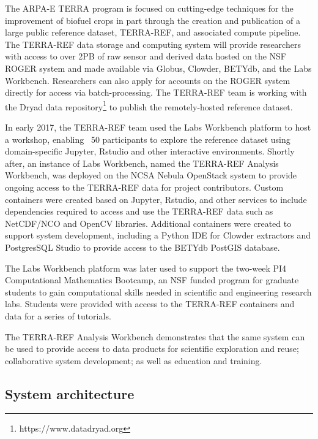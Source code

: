 \documentclass{sig-alternate}
\begin{document}
The ARPA-E TERRA program is focused on cutting-edge techniques for the improvement of biofuel crops in part through the creation and publication of a large public reference dataset, TERRA-REF, and associated compute pipeline\cite{arpae2015}. The TERRA-REF data storage and computing system will provide researchers with access to over 2PB of raw sensor and derived data hosted on the NSF ROGER system and made available via Globus, Clowder, BETYdb, and the Labs Workbench. Researchers can also apply for accounts on the ROGER system directly for access via batch-processing. The TERRA-REF team is working with the Dryad data repository\footnote{https://www.datadryad.org} to publish the remotely-hosted reference dataset.

In early 2017, the TERRA-REF team used the Labs Workbench platform to host a workshop, enabling ~50 participants to explore the reference dataset using domain-specific Jupyter, Rstudio and other interactive environments. Shortly after, an instance of Labs Workbench, named the TERRA-REF Analysis Workbench, was deployed on the NCSA Nebula OpenStack system to provide ongoing access to the TERRA-REF data for project contributors. Custom containers were created based on Jupyter, Rstudio, and other services to include dependencies required to access and use the TERRA-REF data such as NetCDF/NCO and OpenCV libraries.  Additional containers were created to support system development, including a Python IDE for Clowder extractors and PostgresSQL Studio to provide access to the BETYdb PostGIS database.

The Labs Workbench platform was later used to support the two-week PI4 Computational Mathematics Bootcamp, an NSF funded program for graduate students to gain computational skills needed in scientific and engineering research labs. Students were provided with access to the TERRA-REF containers and data for a series of tutorials.

The TERRA-REF Analysis Workbench demonstrates that the same system can be used to provide access to data products for scientific exploration and reuse; collaborative system development; as well as education and training.


\subsection{System architecture}
\end{document}
